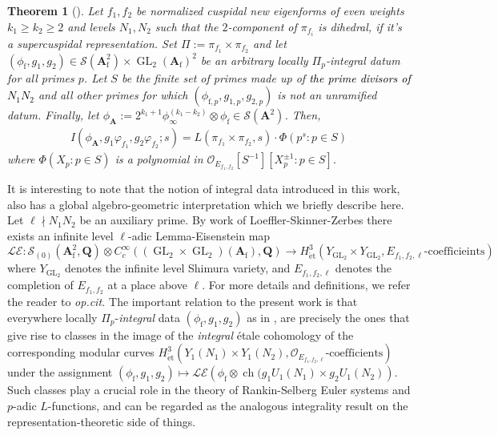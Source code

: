 \documentclass{amsart}
\theoremstyle{plain}
\newtheorem{theorem}{Theorem}
\theoremstyle{plain}
\theoremstyle{remark}
\DeclareMathOperator{\GL}{GL}
\DeclareMathOperator{\ch}{ch}
\begin{document}
\begin{theorem}[]\label{thm intro B}
    Let $f_1,f_2$ be normalized cuspidal new eigenforms of even weights $k_1\geq k_2\geq 2$ and levels $N_1,N_2$ such that the $2$-component of $\pi_{f_i}$ is dihedral, if it's a supercuspidal representation. Set $\Pi:=\pi_{f_1}\times\pi_{f_2}$ and let $(\phi_\mathrm{f},g_1,g_2)\in\mathcal{S}(\mathbf{A}_\mathrm{f}^2)\times \GL_2(\mathbf{A}_\mathrm{f})^2$ be an arbitrary locally $\Pi_p$-integral datum for all primes $p$. Let $S$ be the finite set of primes made up of \textcolor{black}{the prime divisors of $N_1N_2$} and all other primes for which $(\phi_{\mathrm{f},p},g_{1,p},g_{2,p})$ is not an unramified datum. Finally, let $\phi_\mathbf{A}:=2^{k_1+1}\phi_\infty^{(k_1-k_2)}\otimes\phi_\mathrm{f}\in\mathcal{S}(\mathbf{A}^2)$. Then,
    \begin{align*}
I(\phi_\mathbf{A},g_1\varphi_{f_1},g_2\varphi_{f_2};s)=L(\pi_{f_1}\times\pi_{f_2},s)\cdot \Phi(p^s : p\in S)
\end{align*}
where $\Phi(X_p :p\in S)$ is a polynomial in $ \mathcal{O}_{E_{f_1,f_2}}[S^{-1}][X_p^{\pm 1} : p\in S]$. 
\end{theorem}

It is interesting to note that the notion of integral data introduced in this work, also has a global algebro-geometric interpretation which we briefly describe here. Let $\ell\nmid N_1N_2$ be an auxiliary prime. By work of Loeffler-Skinner-Zerbes \cite{loeffler2021euler} there exists an infinite level $\ell$-adic Lemma-Eisenstein map 
$$\mathcal{LE}:\mathcal{S}_{(0)}(\mathbf{A}_\mathrm{f}^2,\mathbf{Q})\otimes C_c^\infty((\GL_2\times\GL_2)(\mathbf{A}_\mathrm{f}),\mathbf{Q})\rightarrow H^3_\mathrm{\acute{e}t}(Y_{\GL_2}\times Y_{\GL_2},E_{f_1,f_2,\ell}\text{-}\mathrm{coefficieints})$$
where $Y_{\GL_2}$ denotes the infinite level Shimura variety, and $E_{f_1,f_2,\ell}$ denotes the completion of $E_{f_1,f_2}$ at a place above $\ell$. For more details and definitions, we refer the reader to \textit{op.cit.} The important relation to the present work is that everywhere locally $\Pi_p$-\textit{integral} data $(\phi_\mathrm{f},g_1,g_2)$ as in , are precisely the ones that give rise to classes in the image of the \textit{integral} \'etale cohomology of the corresponding modular curves $H^3_\mathrm{\acute{e}t}(Y_1(N_1)\times Y_1(N_2),\mathcal{O}_{E_{f_1,f_2,\ell}}\text{-}\mathrm{coefficients})$
under the assignment
$(\phi_\mathrm{f},g_1,g_2)\mapsto\mathcal{LE}\left(\phi_\mathrm{f}\otimes\ch(g_1U_1(N_1)\times g_2U_1(N_2)\right).$ Such classes play a crucial role in the theory of Rankin-Selberg Euler systems and $p$-adic $L$-functions, and  can be regarded as the analogous integrality result on the representation-theoretic side of things.
\end{document}
